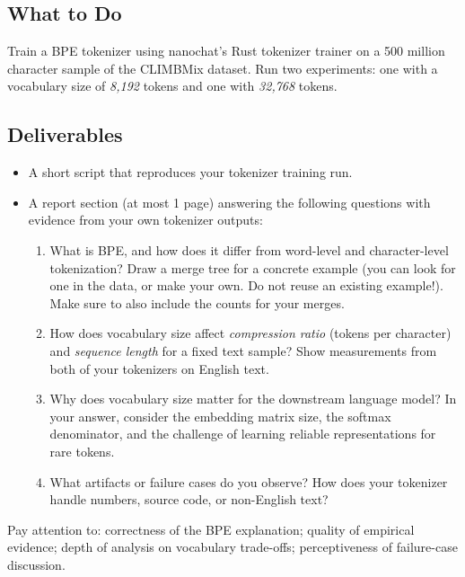 \subsection{What to Do}

Train a BPE tokenizer using nanochat's Rust tokenizer trainer on a 500 million character sample of the CLIMBMix dataset. Run two experiments: one with a vocabulary size of \textit{8{,}192} tokens and one with \textit{32{,}768} tokens.

\subsection{Deliverables}

\begin{itemize}
    \item A short script that reproduces your tokenizer training run.
    \item A report section (at most 1 page) answering the following questions with evidence from your own tokenizer outputs:
          \begin{enumerate}
              \item What is BPE, and how does it differ from word-level and character-level tokenization?  Draw a merge tree for a concrete example (you can look for one in the data, or make your own. Do not reuse an existing example!). Make sure to also include the counts for your merges.
              \item How does vocabulary size affect \emph{compression ratio} (tokens per character) and \emph{sequence length} for a fixed text sample?  Show measurements from both of your tokenizers on English text.
              \item Why does vocabulary size matter for the downstream language model?  In your answer, consider the embedding matrix size, the softmax denominator, and the challenge of learning reliable representations for rare tokens.
              \item What artifacts or failure cases do you observe?  How does your tokenizer handle numbers, source code, or non-English text?
          \end{enumerate}
\end{itemize}
%
Pay attention to: correctness of the BPE explanation; quality of empirical evidence; depth of analysis on vocabulary trade-offs; perceptiveness of failure-case discussion.

